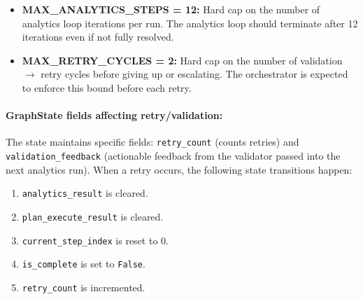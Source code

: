 
\begin{itemize}[label=\textbullet]
  \item \textbf{MAX\_ANALYTICS\_STEPS = 12:} Hard cap on the number of analytics loop iterations per run. The analytics loop should terminate after 12 iterations even if not fully resolved.
  \item \textbf{MAX\_RETRY\_CYCLES = 2:} Hard cap on the number of validation $\rightarrow$ retry cycles before giving up or escalating. The orchestrator is expected to enforce this bound before each retry.
\end{itemize}

\paragraph{GraphState fields affecting retry/validation:}
The state maintains specific fields: \texttt{retry\_count} (counts retries) and \texttt{validation\_feedback} (actionable feedback from the validator passed into the next analytics run). When a retry occurs, the following state transitions happen:
\begin{enumerate}[label=(\roman*)]
  \item \texttt{analytics\_result} is cleared.
  \item \texttt{plan\_execute\_result} is cleared.
  \item \texttt{current\_step\_index} is reset to 0.
  \item \texttt{is\_complete} is set to \texttt{False}.
  \item \texttt{retry\_count} is incremented.
\end{enumerate}


